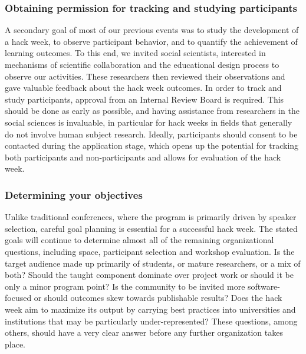 \documentclass{aastex62}
\begin{document}
\subsubsection{Obtaining permission for tracking and studying participants}
A secondary goal of most of our previous events was to study the development of a hack week, to observe participant behavior, and to quantify the achievement of learning outcomes. To this end, we invited social scientists, interested in mechanisms of scientific collaboration and the educational design process to observe our activities. These researchers then reviewed their observations and gave valuable feedback about the hack week outcomes. In order to track and study participants, approval from an Internal Review Board is required. This should be done as early as possible, and having assistance from researchers in the social sciences is invaluable, in particular for hack weeks in fields that generally do not involve human subject research. Ideally, participants should consent to be contacted during the application stage, which opens up the potential for tracking both participants and non-participants and allows for evaluation of the hack week.

\subsubsection{Determining your objectives}

Unlike traditional conferences, where the program is primarily driven by speaker selection, careful goal planning is essential for a successful hack week. The stated goals will continue to determine almost all of the remaining organizational questions, including space, participant selection and workshop evaluation. Is the target audience made up primarily of students, or mature researchers, or a mix of both? Should the taught component dominate over project work or should it be only a minor program point? Is the community to be invited more software-focused or should outcomes skew towards publishable results? Does the hack week aim to maximize its output by carrying best practices into universities and institutions that may be particularly under-represented? These questions, among others, should have a very clear answer before any further organization takes place.
\end{document}
